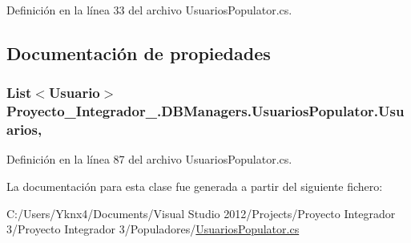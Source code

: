 Definición en la línea 33 del archivo Usuarios\-Populator.\-cs.



\subsection{Documentación de propiedades}
\hypertarget{class_proyecto___integrador__3_1_1_d_b_managers_1_1_usuarios_populator_adbf816391dedd5522f050c53a22319da}{
\subsubsection[{Usuarios}]{\setlength{\rightskip}{0pt plus 5cm}List$<${\bf Usuario}$>$ Proyecto\-\_\-\-Integrador\-\_.\-D\-B\-Managers.\-Usuarios\-Populator.\-Usuarios\hspace{0.3cm}{\ttfamily [get]}, {\ttfamily [set]}}}\label{class_proyecto___integrador__3_1_1_d_b_managers_1_1_usuarios_populator_adbf816391dedd5522f050c53a22319da}


Definición en la línea 87 del archivo Usuarios\-Populator.\-cs.



La documentación para esta clase fue generada a partir del siguiente fichero\-:\begin{DoxyCompactItemize}
\item 
C\-:/\-Users/\-Yknx4/\-Documents/\-Visual Studio 2012/\-Projects/\-Proyecto Integrador 3/\-Proyecto Integrador 3/\-Populadores/\hyperlink{_usuarios_populator_8cs}{Usuarios\-Populator.\-cs}\end{DoxyCompactItemize}
